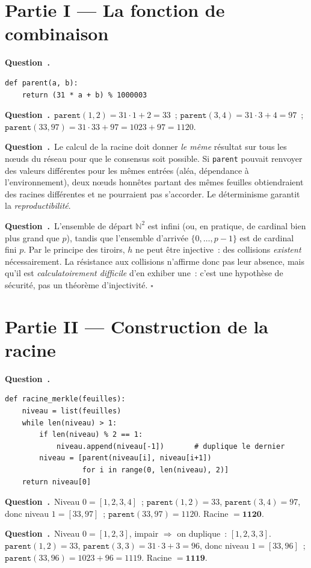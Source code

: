 \documentclass[11pt,a4paper]{article}
\newcounter{qcnt}
\newcommand{\Q}{\medskip\par\stepcounter{qcnt}\noindent\textbf{Question~\theqcnt.}~}
\newcommand{\code}[1]{\lstinline!#1!}
\begin{document}
\section*{Partie I --- La fonction de combinaison}

\Q
\begin{lstlisting}
def parent(a, b):
    return (31 * a + b) % 1000003
\end{lstlisting}

\Q $\mathtt{parent}(1,2) = 31\cdot1+2 = 33$~; $\mathtt{parent}(3,4)=31\cdot3+4=97$~;
$\mathtt{parent}(33,97)=31\cdot33+97=1023+97=1120$.

\Q Le calcul de la racine doit donner \emph{le même} résultat sur tous les n\oe uds du réseau
pour que le consensus soit possible. Si \code{parent} pouvait renvoyer des valeurs différentes
pour les mêmes entrées (aléa, dépendance à l'environnement), deux n\oe uds honnêtes partant des
mêmes feuilles obtiendraient des racines différentes et ne pourraient pas s'accorder. Le
déterminisme garantit la \emph{reproductibilité}.

\Q L'ensemble de départ $\mathbb{N}^2$ est infini (ou, en pratique, de cardinal bien plus grand
que $p$), tandis que l'ensemble d'arrivée $\{0,\dots,p-1\}$ est de cardinal fini $p$. Par le
principe des tiroirs, $h$ ne peut être injective~: des collisions \emph{existent}
nécessairement. La résistance aux collisions n'affirme donc pas leur absence, mais qu'il est
\emph{calculatoirement difficile} d'en exhiber une~: c'est une hypothèse de sécurité, pas un
théorème d'injectivité. $\square$

\section*{Partie II --- Construction de la racine}

\Q
\begin{lstlisting}
def racine_merkle(feuilles):
    niveau = list(feuilles)
    while len(niveau) > 1:
        if len(niveau) % 2 == 1:
            niveau.append(niveau[-1])       # duplique le dernier
        niveau = [parent(niveau[i], niveau[i+1])
                  for i in range(0, len(niveau), 2)]
    return niveau[0]
\end{lstlisting}

\Q Niveau $0=[1,2,3,4]$~; $\mathtt{parent}(1,2)=33$, $\mathtt{parent}(3,4)=97$, donc niveau
$1=[33,97]$~; $\mathtt{parent}(33,97)=1120$. Racine $=\mathbf{1120}$.

\Q Niveau $0=[1,2,3]$, impair $\Rightarrow$ on duplique~: $[1,2,3,3]$. $\mathtt{parent}(1,2)=33$,
$\mathtt{parent}(3,3)=31\cdot3+3=96$, donc niveau $1=[33,96]$~; $\mathtt{parent}(33,96)=1023+96=
1119$. Racine $=\mathbf{1119}$.
\end{document}
